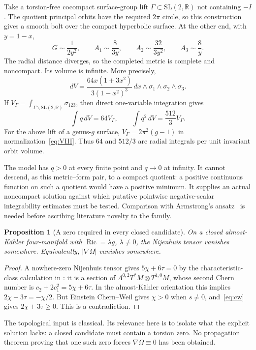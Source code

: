 \documentclass[11pt]{article}
\newcommand{\Ric}{\operatorname{Ric}}
\newcommand{\R}{\mathbb R}
\newtheorem{proposition}[theorem]{Proposition}
\theoremstyle{definition}
\theoremstyle{remark}
\begin{document}
Take a torsion-free cocompact surface-group lift
$\Gamma\subset\mathrm{SL}(2,\R)$ not containing $-I$.
The quotient principal orbits have the required $2\pi$ circle, so this
construction gives a smooth bolt over the compact hyperbolic surface.
At the other end, with $y=1-x$,
\begin{equation}
 G\sim\frac1{2y^2},\qquad
 A_1\sim\frac8{3y},\qquad
 A_2\sim\frac{32}{3y^2},\qquad
 A_3\sim\frac8y.
 \label{eq:infinite-end}
\end{equation}
The radial distance diverges, so the completed metric is complete and
noncompact. Its volume is infinite. More precisely,
\begin{equation}
 dV=\frac{64x(1+3x^2)}{3(1-x^2)^3}\,dx\wedge\sigma_1\wedge\sigma_2\wedge\sigma_3.
 \label{eq:VIII-volume}
\end{equation}
If $V_\Gamma=\int_{\Gamma\backslash\mathrm{SL}(2,\R)}\sigma_{123}$,
then direct one-variable integration gives
\begin{equation}
 \int q\,dV=64V_\Gamma,\qquad
 \int q^2\,dV=\frac{512}{3}V_\Gamma.
 \label{eq:VIII-integrals}
\end{equation}
For the above lift of a genus-$g$ surface,
$V_\Gamma=2\pi^2(g-1)$ in normalization~\eqref{eq:VIII}.
Thus $64$ and $512/3$ are radial integrals per unit invariant orbit volume.

The model has $q>0$ at every finite point and $q\to0$ at infinity.
It cannot descend, as this metric--form pair, to a compact quotient:
a positive continuous function on such a quotient would have a positive
minimum. It supplies an actual noncompact solution against which putative
pointwise negative-scalar integrability estimates must be tested.
Comparison with Armstrong's ansatz~\cite{ArmstrongAnsatz} is needed before
ascribing literature novelty to the family.

\begin{proposition}[A zero required in every closed candidate]
\label{prop:zero}
On a closed almost-K\"ahler four-manifold with $\Ric=\lambda g$,
$\lambda\ne0$, the Nijenhuis tensor vanishes somewhere. Equivalently,
$|\nabla\Omega|$ vanishes somewhere.
\end{proposition}
\begin{proof}
A nowhere-zero Nijenhuis tensor gives
$5\chi+6\tau=0$ by the characteristic-class calculation in
\cite{ArmstrongThesis}: it is a section of
$\Lambda^{0,2}T^*M\otimes T^{1,0}M$, whose second Chern number is
$c_2+2c_1^2=5\chi+6\tau$. In the almost-K\"ahler orientation this implies
$2\chi+3\tau=-\chi/2$. But Einstein Chern--Weil gives
$\chi>0$ when $s\ne0$, and~\eqref{eq:cw} gives
$2\chi+3\tau\ge0$. This is a contradiction.
\end{proof}
The topological input is classical. Its relevance here is to isolate what
the explicit solution lacks: a closed candidate must contain a torsion zero.
No propagation theorem proving that one such zero forces
$\nabla\Omega\equiv0$ has been obtained.
\end{document}
